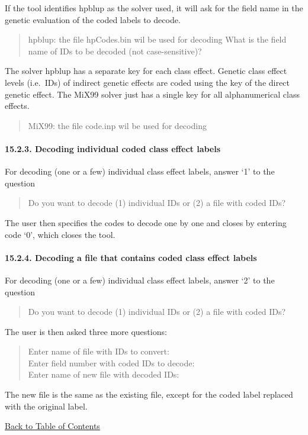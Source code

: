 If the tool identifies hpblup as the solver used, it will ask for the
field name in the genetic evaluation of the coded labels to decode.

\begin{quote}
hpblup: the file hpCodes.bin wil be used for decoding What is the field
name of IDs to be decoded (not case-sensitive)?
\end{quote}

The solver hpblup has a separate key for each class effect. Genetic
class effect levels (i.e.~IDs) of indirect genetic effects are coded
using the key of the direct genetic effect. The MiX99 solver just has a
single key for all alphanumerical class effects.

\begin{quote}
MiX99: the file code.inp wil be used for decoding
\end{quote}

\paragraph{15.2.3. Decoding individual coded class effect
labels}\label{Deco06}

For decoding (one or a few) individual class effect labels, answer `1'
to the question

\begin{quote}
Do you want to decode (1) individual IDs or (2) a file with coded IDs?
\end{quote}

The user then specifies the codes to decode one by one and closes by
entering code `0', which closes the tool.

\paragraph{15.2.4. Decoding a file that contains coded class effect
labels}\label{Deco07}

For decoding (one or a few) individual class effect labels, answer `2'
to the question

\begin{quote}
Do you want to decode (1) individual IDs or (2) a file with coded IDs?
\end{quote}

The user is then asked three more questions:

\begin{quote}
Enter name of file with IDs to convert:\\
Enter field number with coded IDs to decode:\\
Enter name of new file with decoded IDs:\\
\end{quote}

The new file is the same as the existing file, except for the coded
label replaced with the original label.

\hyperref[Tabl01]{Back to Table of Contents}

\newpage
